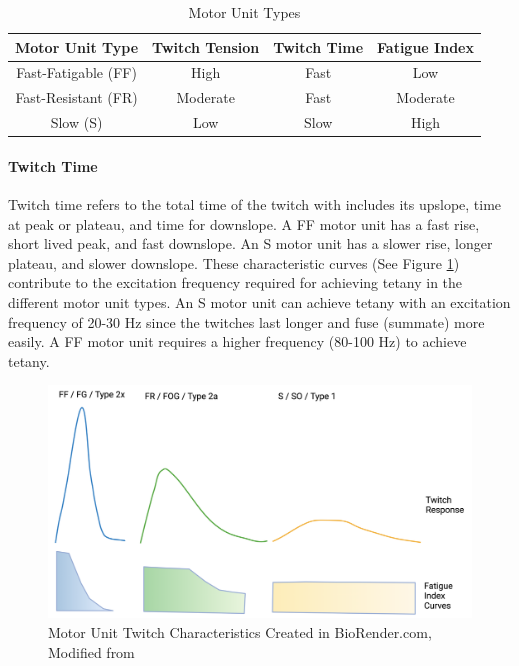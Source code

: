 \begin{table}[h!]
\centering
\begin{tabular}{||c c c c||} 
 \hline
 Motor Unit Type & Twitch Tension & Twitch Time & Fatigue Index \\ [0.5ex] 
 \hline\hline
 Fast-Fatigable (FF)  & High & Fast & Low \\ 
 Fast-Resistant (FR)  & Moderate & Fast & Moderate \\
 Slow (S) &  Low & Slow & High \\ [1ex] 
 \hline
\end{tabular}
\caption{Motor Unit Types}
\label{table:Motor_Unit_Types}
\end{table}

\paragraph{Twitch Time}
Twitch time refers to the total time of the twitch with includes its upslope, time at peak or plateau, and time for downslope. A FF motor unit has a fast rise, short lived peak, and fast downslope. An S motor unit has a slower rise, longer plateau, and slower downslope. These characteristic curves (See Figure \ref{fig:mu_twitch}) contribute to the excitation frequency required for achieving tetany in the different motor unit types. An S motor unit can achieve tetany with an excitation frequency of 20-30 Hz since the twitches last longer and fuse (summate) more easily. A FF motor unit requires a higher frequency (80-100 Hz) to achieve tetany. 

\begin{figure}[!ht]
    \centering
    \includegraphics[width=1\linewidth]{./figure/mu_twitch.png}
    \caption{Motor Unit Twitch Characteristics \footnotesize{Created in BioRender.com, Modified from \cite{jones_skeletal_2006}}}
    \label{fig:mu_twitch}
\end{figure}

